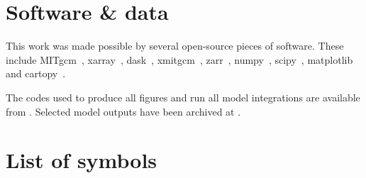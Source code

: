 \chapter*{Software \& data}
This work was made possible by several open-source pieces of software. These include MITgcm~\citep{MITgcm2022}, xarray~\citep{Hoyer2017}, dask~\citep{DaskDevelopmentTeam2016, Rocklin2015}, xmitgcm~\citep{Abernathey2021}, zarr~\citep{Miles2022}, numpy~\citep{Harris2020}, scipy~\citep{Virtanen2020}, matplotlib~\citep{Hunter2007} and cartopy~\citep{Elson2022}.

The codes used to produce all figures and run all model integrations are available from \citet{siV1p0, nbcV1p0, dwbcV1p1, irmingerV1p0}. Selected model outputs have been archived at \citet{ThesisData}.

\chapter*{List of symbols}

